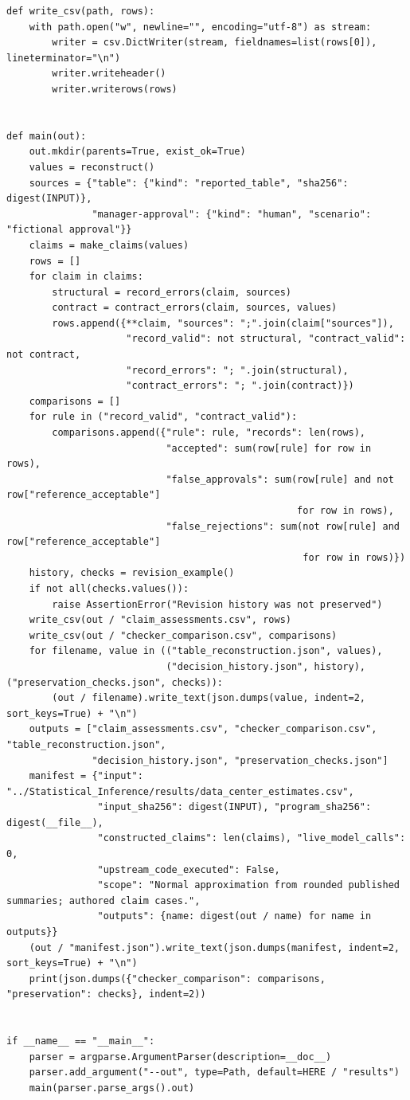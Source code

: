 \begin{Verbatim}[breaklines,breakanywhere,fontsize=\small]
def write_csv(path, rows):
    with path.open("w", newline="", encoding="utf-8") as stream:
        writer = csv.DictWriter(stream, fieldnames=list(rows[0]), lineterminator="\n")
        writer.writeheader()
        writer.writerows(rows)


def main(out):
    out.mkdir(parents=True, exist_ok=True)
    values = reconstruct()
    sources = {"table": {"kind": "reported_table", "sha256": digest(INPUT)},
               "manager-approval": {"kind": "human", "scenario": "fictional approval"}}
    claims = make_claims(values)
    rows = []
    for claim in claims:
        structural = record_errors(claim, sources)
        contract = contract_errors(claim, sources, values)
        rows.append({**claim, "sources": ";".join(claim["sources"]),
                     "record_valid": not structural, "contract_valid": not contract,
                     "record_errors": "; ".join(structural),
                     "contract_errors": "; ".join(contract)})
    comparisons = []
    for rule in ("record_valid", "contract_valid"):
        comparisons.append({"rule": rule, "records": len(rows),
                            "accepted": sum(row[rule] for row in rows),
                            "false_approvals": sum(row[rule] and not row["reference_acceptable"]
                                                   for row in rows),
                            "false_rejections": sum(not row[rule] and row["reference_acceptable"]
                                                    for row in rows)})
    history, checks = revision_example()
    if not all(checks.values()):
        raise AssertionError("Revision history was not preserved")
    write_csv(out / "claim_assessments.csv", rows)
    write_csv(out / "checker_comparison.csv", comparisons)
    for filename, value in (("table_reconstruction.json", values),
                            ("decision_history.json", history), ("preservation_checks.json", checks)):
        (out / filename).write_text(json.dumps(value, indent=2, sort_keys=True) + "\n")
    outputs = ["claim_assessments.csv", "checker_comparison.csv", "table_reconstruction.json",
               "decision_history.json", "preservation_checks.json"]
    manifest = {"input": "../Statistical_Inference/results/data_center_estimates.csv",
                "input_sha256": digest(INPUT), "program_sha256": digest(__file__),
                "constructed_claims": len(claims), "live_model_calls": 0,
                "upstream_code_executed": False,
                "scope": "Normal approximation from rounded published summaries; authored claim cases.",
                "outputs": {name: digest(out / name) for name in outputs}}
    (out / "manifest.json").write_text(json.dumps(manifest, indent=2, sort_keys=True) + "\n")
    print(json.dumps({"checker_comparison": comparisons, "preservation": checks}, indent=2))


if __name__ == "__main__":
    parser = argparse.ArgumentParser(description=__doc__)
    parser.add_argument("--out", type=Path, default=HERE / "results")
    main(parser.parse_args().out)
\end{Verbatim}
